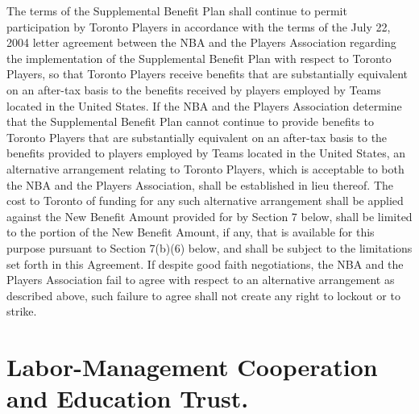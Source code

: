 \documentclass[
]{book}
\begin{document}
\begin{enumerate}
  The terms of the Supplemental Benefit Plan shall continue to permit participation by Toronto Players in accordance with the terms of the July 22, 2004 letter agreement between the NBA and the Players Association regarding the implementation of the Supplemental Benefit Plan with respect to Toronto Players, so that Toronto Players receive benefits that are substantially equivalent on an after-tax basis to the benefits received by players employed by Teams located in the United States. If the NBA and the Players Association determine that the Supplemental Benefit Plan cannot continue to provide benefits to Toronto Players that are substantially equivalent on an after-tax basis to the benefits provided to players employed by Teams located in the United States, an alternative arrangement relating to Toronto Players, which is acceptable to both the NBA and the Players Association, shall be established in lieu thereof. The cost to Toronto of funding for any such alternative arrangement shall be applied against the New Benefit Amount provided for by Section 7 below, shall be limited to the portion of the New Benefit Amount, if any, that is available for this purpose pursuant to Section 7(b)(6) below, and shall be subject to the limitations set forth in this Agreement. If despite good faith negotiations, the NBA and the Players Association fail to agree with respect to an alternative arrangement as described above, such failure to agree shall not create any right to lockout or to strike.
\end{enumerate}

\hypertarget{labor-management-cooperation-and-education-trust.}{%
\section{Labor-Management Cooperation and Education Trust.}\label{labor-management-cooperation-and-education-trust.}}
\end{document}
